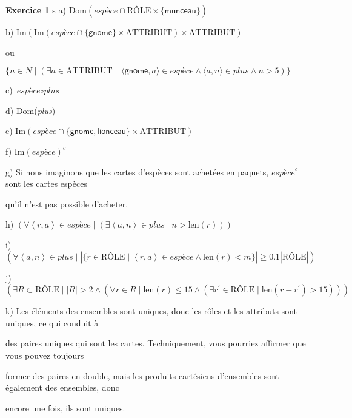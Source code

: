 \documentclass{article}
\newcommand{\role}{\mbox{RÔLE}}
\newcommand{\attribut}{\mbox{ATTRIBUT}}
\newcommand{\compose}{\circ}
\newcommand{\tuple}[1]{\ensuremath{\left\langle #1 \right\rangle}}
\begin{document}
\textbf{Exercice 1}
s
a) $\text{Dom}(\textit{espèce} \cap \role \times \{ \textsf{munceau} \} )$

\vspace{0.5cm}

b) $ \text{Im}( \text{Im}( \textit{espèce} \cap \{ \textsf{gnome} \} \times \attribut ) \times \attribut ) $ 

ou

$\{ n \in N \mid (\exists a \in \attribut\ \mid \langle \textsf{gnome},a  \rangle \in \textit{espèce} \land \langle a,n \rangle \in \textit{plus} \land n > 5 )\}$

\vspace{0.5cm}

c) $\textit{espèce} \compose \textit{plus}$

\vspace{0.5cm}

d) Dom(\textit{plus})

\vspace{0.5cm}

e) $ \text{Im}(\textit{espèce} \cap \{ \textsf{gnome}, \textsf{lionceau} \} \times \attribut)$

\vspace{0.5cm}

f) $ \text{Im}(\textit{espèce})^{c} $

\vspace{0.5cm}

g) Si nous imaginons que les cartes d'espèces sont achetées en paquets, $\textit{espèce}^{c}$ sont les cartes espèces 

qu'il n'est pas possible d'acheter.

\vspace{0.5cm}

h) $( \forall \tuple{r,a} \in \textit{espèce} \mid ( \exists \tuple{a,n} \in \textit{plus} \mid n > \text{len}(r) ))$

\vspace{0.5cm}

i) $ (  \forall \tuple{a,n} \in \textit{plus} \mid |\{ r \in \role \mid \tuple{r,a} \in \textit{espèce} \land \text{len}(r) < m \}| \geq 0.1 | \role | ) $

\vspace{0.5cm}

j) $( \exists R \subset \role \mid |R| > 2 \land ( \forall r \in R \mid \text{len}(r) \leq 15 \land ( \exists r^{\prime} \in \role \mid \text{len}(r - r^{\prime}) > 15 ) ) ) $

\vspace{0.5cm}

k) Les éléments des ensembles sont uniques, donc les rôles et les attributs sont uniques, ce qui conduit à

des paires uniques qui sont les cartes. Techniquement, vous pourriez affirmer que vous pouvez toujours 

former des paires en double, mais les produits cartésiens d'ensembles sont également des ensembles, donc 

encore une fois, ils sont uniques.
\end{document}
